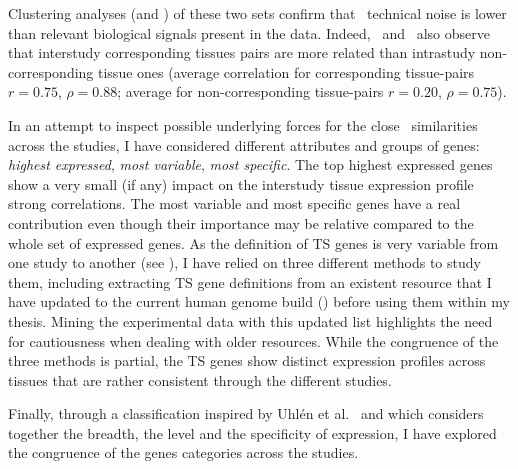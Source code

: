 Clustering analyses (and \Welchttest) of these two sets
confirm that \Rnaseq\ technical noise is
lower than relevant biological signals present in the data.
Indeed,~\cite{Sudmant2015-zt,Danielsson2015-cn,Yu2015-uh} and~\cite{Uhlen:2016}
also observe that interstudy corresponding tissues pairs are more related than
intrastudy non-corresponding tissue ones
(average correlation for corresponding tissue-pairs $r=0.75$, $\rho=0.88$;
average for non-corresponding tissue-pairs $r=0.20$, $\rho=0.75$).

In an attempt to inspect possible underlying forces for the close \treps\
similarities across the studies,
I have considered different attributes and groups of genes:
\emph{highest expressed}, \emph{most variable}, \emph{most specific}.
The top highest expressed genes show a very small (if any) impact on
the interstudy tissue expression profile strong correlations.
The most variable and most specific genes have a real contribution even though
their importance may be relative compared to the whole set of expressed genes.
As the definition of \gls{TS} genes is very variable from one study to another
(see \Cref{sub:TisSpeGene}),
I have relied on three different methods to study them,
including extracting \gls{TS} gene definitions
from an existent resource
that I have updated to the current human genome build ()
before using them within my thesis.
Mining the experimental data with this updated list highlights
the need for cautiousness when dealing with older resources.
While the congruence of the three methods is partial,
the \gls{TS} genes show distinct expression profiles across tissues
that are rather consistent through the different studies.

Finally, through a classification inspired
by Uhlén et al.\ 
and which considers together the breadth, the level and the specificity of expression,
I have explored the congruence of the genes categories across the studies.

